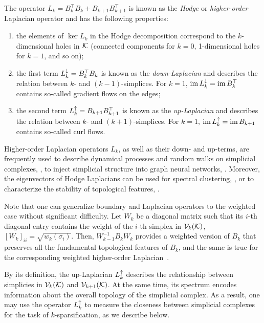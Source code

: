 \begin{definition}
      The operator \( L_k = B_k^\top B_k + B_{k+1} B_{k+1}^\top \) is known as the \emph{Hodge} or \emph{higher-order} Laplacian operator and has the following properties: 
      \begin{enumerate}
            \item the elements of \( \ker L_k \) in the Hodge decomposition correspond to the \( k \)-dimensional holes in \( \mathcal{K} \) (connected components for \( k = 0 \), 1-dimensional holes for \( k = 1\), and so on);
            \item the first term \( L_{k}^{\downarrow} = B_k^\top B_k \) is known as the \emph{down-Laplacian} and describes the relation between \( k\)- and \( (k-1)\)-simplices. For \( k = 1 \), \( \operatorname{im} L_{k}^{\downarrow} = \operatorname{im} B_k^\top \) contains so-called gradient flows on the edges;
            \item the second term \( L_{k}^{\uparrow} = B_{k+1} B_{k+1}^\top \) is known as the \emph{up-Laplacian} and describes the relation between \( k\)- and \( (k+1)\)-simplices. For \( k = 1 \), \( \operatorname{im} L_{k}^{\uparrow} = \operatorname{im} B_{k+1} \) contains so-called curl flows.
      \end{enumerate}
\end{definition}


Higher-order Laplacian operators \( L_k \), as well as their down- and up-terms, are frequently used to describe dynamical processes and random walks on simplicial complexes, \cite{schaub2019random}, to inject simplicial structure into graph neural networks, \cite{ebli2020simplicial}. Moreover, the eigenvectors of Hodge Laplacians can be used for spectral clustering, \cite{grande2024node,ebli2019notion}, or to characterize the stability of topological features, \cite{guglielmi2023quantifying}.

Note that one can generalize boundary and Laplacian operators to the weighted case without significant difficulty. Let \( W_k \) be a diagonal matrix such that its \(i\)-th diagonal entry contains the weight of the \(i\)-th simplex in \( \mathcal{V}_{k}(\mathcal{K}) \), \( [W_k]_{ii} = \sqrt{w_k(\sigma_i)}\). Then,  \(W_{k-1}^{-1} B_k W_k \) provides a weighted version of $B_k$ that preserves all the fundamental topological features of $B_k$, and the same is true for the corresponding weighted higher-order Laplacian~\cite{guglielmi2023quantifying}.

By its definition, the up-Laplacian \( L_{k}^{\uparrow} \) describes the relationship between simplicies in \( \mathcal{V}_{k}(\mathcal{K}) \) and \( \mathcal{V}_{k+1}(\mathcal{K}) \). At the same time, its spectrum encodes information about the overall topology of the simplicial complex. As a result, one may use the operator \( L_{k}^{\uparrow} \) to measure the closeness between simplicial complexes for the task of \( k \)-sparsification, as we describe below.

